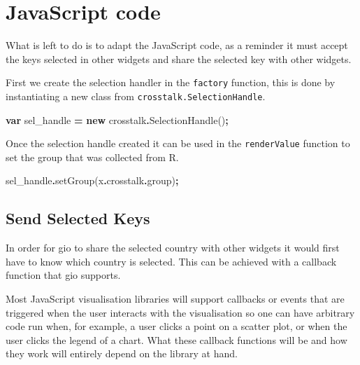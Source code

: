 \documentclass[
]{krantz}
\makeatletter
\newenvironment{Shaded}{\begin{snugshade}}{\end{snugshade}}
\newcommand{\AttributeTok}[1]{\textcolor[rgb]{0.61,0.61,0.61}{#1}}
\newcommand{\FunctionTok}[1]{\textcolor[rgb]{0,0,0}{#1}}
\newcommand{\KeywordTok}[1]{\textcolor[rgb]{0.27,0.27,0.27}{\textbf{#1}}}
\newcommand{\NormalTok}[1]{#1}
\newcommand{\OperatorTok}[1]{\textcolor[rgb]{0.43,0.43,0.43}{\textbf{#1}}}
\newenvironment{kframe}{%
\medskip{}
\setlength{\fboxsep}{.8em}
 \def\at@end@of@kframe{}%
 \ifinner\ifhmode%
  \def\at@end@of@kframe{\end{minipage}}%
  \begin{minipage}{\columnwidth}%
 \fi\fi%
 \def\FrameCommand##1{\hskip\@totalleftmargin \hskip-\fboxsep
 \colorbox{shadecolor}{##1}\hskip-\fboxsep
     \hskip-\linewidth \hskip-\@totalleftmargin \hskip\columnwidth}%
 \MakeFramed {\advance\hsize-\width
   \@totalleftmargin\z@ \linewidth\hsize
   \@setminipage}}%
 {\par\unskip\endMakeFramed%
 \at@end@of@kframe}
\renewenvironment{Shaded}{\begin{kframe}}{\end{kframe}}
\makeatother
\begin{document}
\hypertarget{linking-widgets-js}{%
\section{JavaScript code}\label{linking-widgets-js}}

What is left to do is to adapt the JavaScript code, as a reminder it must accept the keys selected in other widgets and share the selected key with other widgets.

First we create the selection handler in the \texttt{factory} function, this is done by instantiating a new class from \texttt{crosstalk.SelectionHandle}.

\begin{Shaded}
\begin{Highlighting}[]
\KeywordTok{var}\NormalTok{ sel\_handle }\OperatorTok{=} \KeywordTok{new}\NormalTok{ crosstalk}\OperatorTok{.}\FunctionTok{SelectionHandle}\NormalTok{()}\OperatorTok{;}
\end{Highlighting}
\end{Shaded}

Once the selection handle created it can be used in the \texttt{renderValue} function to set the group that was collected from R.

\begin{Shaded}
\begin{Highlighting}[]
\NormalTok{sel\_handle}\OperatorTok{.}\FunctionTok{setGroup}\NormalTok{(x}\OperatorTok{.}\AttributeTok{crosstalk}\OperatorTok{.}\AttributeTok{group}\NormalTok{)}\OperatorTok{;}
\end{Highlighting}
\end{Shaded}

\hypertarget{linking-widgets-send-keys}{%
\subsection{Send Selected Keys}\label{linking-widgets-send-keys}}

In order for gio to share the selected country with other widgets it would first have to know which country is selected. This can be achieved with a callback function that gio supports.

Most JavaScript visualisation libraries will support callbacks or events that are triggered when the user interacts with the visualisation so one can have arbitrary code run when, for example, a user clicks a point on a scatter plot, or when the user clicks the legend of a chart. What these callback functions will be and how they work will entirely depend on the library at hand.
\end{document}
